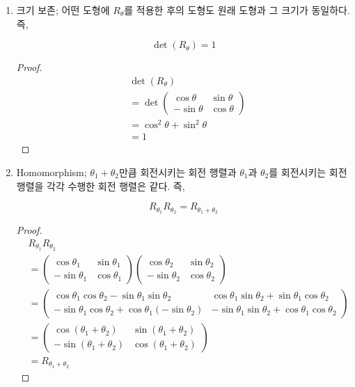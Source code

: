 \documentclass{thesis-SJ}
\begin{document}
\begin{enumerate}
	\item 크기 보존; 어떤 도형에 $R_\theta$를 적용한 후의 도형도 원래 도형과 그 크기가 동일하다. 즉,
	
	\begin{equation}
		\det(R_\theta) = 1
	\end{equation}
	
	\begin{proof}
		
		\begin{align*}
			& \det(R_\theta) \\
			&= \det\begin{pmatrix}
			\cos \theta & \sin \theta \\
			-\sin \theta & \cos \theta 
			\end{pmatrix} \\
			&= \cos^2\theta +\sin^2\theta \\
			&= 1
		\end{align*}
	\end{proof}
	
	\item Homomorphism; $\theta_1+\theta_2$만큼 회전시키는 회전 행렬과 $\theta_1$과 $\theta_2$를 회전시키는 회전 행렬을 각각 수행한 회전 행렬은 같다. 즉,
	
	\begin{equation}
		R_{\theta_1} R_{\theta_2} =R_{\theta_1+\theta_2}
	\end{equation}
	
	\begin{proof}
		\begin{align*}
		& R_{\theta_1} R_{\theta_2} \\
		&= \begin{pmatrix}
		\cos \theta_1 & \sin \theta_1 \\
		-\sin \theta_1 & \cos \theta_1 
		\end{pmatrix}\begin{pmatrix}
		\cos \theta_2 & \sin \theta_2 \\
		-\sin \theta_2 & \cos \theta_2
		\end{pmatrix}\\
		&=\begin{pmatrix}
		\cos \theta_1\cos \theta_2 - \sin \theta_1\sin \theta_2& \cos \theta_1\sin \theta_2 + \sin \theta_1\cos \theta_2\\
	 -\sin \theta_1\cos \theta_2+\cos \theta_1(-\sin \theta_2)& 	-\sin \theta_1\sin \theta_2 + \cos \theta_1\cos \theta_2
		\end{pmatrix}\\
		&=\begin{pmatrix}
		\cos (\theta_1+\theta_2) & \sin (\theta_1+\theta_2) \\
		-\sin (\theta_1+\theta_2) & \cos (\theta_1+\theta_2)
		\end{pmatrix}\\
		&= R_{\theta_1+\theta_2}
		\end{align*}
	\end{proof}
\end{enumerate}
\end{document}
